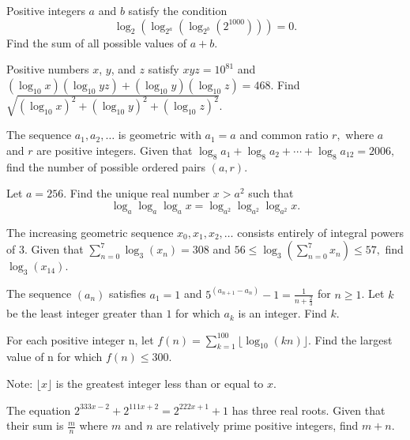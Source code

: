 \documentclass{article}
\begin{document}
\begin{prob}[AIME II 2013/2]{3}
Positive integers $a$ and $b$ satisfy the condition \[\log_2(\log_{2^a}(\log_{2^b}(2^{1000}))) = 0.\] Find the sum of all possible values of $a+b$.
\end{prob}

\begin{req}[AIME II 2010/5]{3}
Positive numbers $x$, $y$, and $z$ satisfy $xyz = 10^{81}$ and $(\log_{10}x)(\log_{10} yz) + (\log_{10}y) (\log_{10}z) = 468$. Find $\sqrt {(\log_{10}x)^2 + (\log_{10}y)^2 + (\log_{10}z)^2}$.
\end{req}

\begin{prob}[AIME I 2006/9]{3}
The sequence $a_1, a_2, \ldots$ is geometric with $a_1=a$ and common ratio $r,$ where $a$ and $r$ are positive integers. Given that $\log_8 a_1+\log_8 a_2+\cdots+\log_8 a_{12} = 2006,$ find the number of possible ordered pairs $(a,r).$
\end{prob}

\begin{prob}[HMMT 2020]{4}
Let $a=256$. Find the unique real number $x>a^2$ such that
\[\log_a \log_a \log_a x = \log_{a^2} \log_{a^2} \log_{a^2} x.\]
\end{prob}

\begin{prob}[AIME II 2007/12]{4}
The increasing geometric sequence $x_{0},x_{1},x_{2},\ldots$ consists entirely of integral powers of $3.$ Given that $\sum_{n=0}^{7}\log_{3}(x_{n}) = 308$ and $56 \leq \log_{3}\left ( \sum_{n=0}^{7}x_{n}\right ) \leq 57,$ find $\log_{3}(x_{14}).$
\end{prob}

\begin{prob}[AIME I 2009/7]{4}
The sequence $(a_n)$ satisfies $a_1 = 1$ and $5^{(a_{n + 1} - a_n)} - 1 = \frac {1}{n + \frac {2}{3}}$ for $n \geq 1$. Let $k$ be the least integer greater than $1$ for which $a_k$ is an integer. Find $k$.
\end{prob}

\begin{prob}[AIME I 2010/14]{4}
For each positive integer n, let $f(n) = \sum_{k = 1}^{100} \lfloor \log_{10} (kn) \rfloor$. Find the largest value of n for which $f(n) \le 300$.

Note: $\lfloor x \rfloor$ is the greatest integer less than or equal to $x$.
\end{prob}

\begin{req}[AIME I 2005/8]{6}
The equation $2^{333x-2} + 2^{111x+2} = 2^{222x+1} + 1$ has three real roots. Given that their sum is $\frac mn$ where $m$ and $n$ are relatively prime positive integers, find $m+n.$
\end{req}
\end{document}
